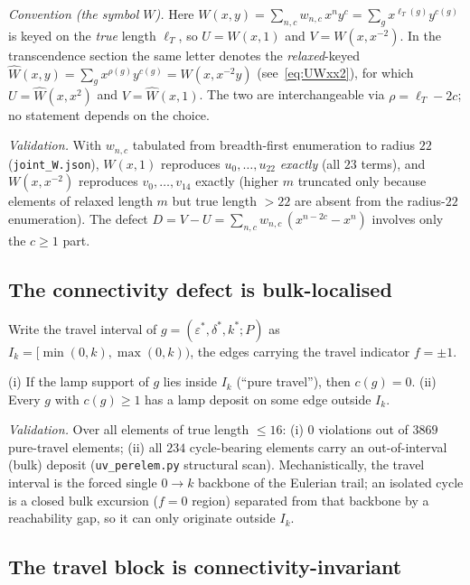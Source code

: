 \noindent\emph{Convention \textup(the symbol $W$\textup).} Here $W(x,y)=\sum_{n,c}w_{n,c}\,x^{n}y^{c}
=\sum_g x^{\ell_T(g)}y^{c(g)}$ is keyed on the \emph{true} length $\ell_T$, so $U=W(x,1)$ and
$V=W(x,x^{-2})$. In the transcendence section the same letter denotes the \emph{relaxed}-keyed
$\widehat W(x,y)=\sum_g x^{\rho(g)}y^{c(g)}=W(x,x^{-2}y)$ \textup(see~\eqref{eq:UWxx2}\textup), for which
$U=\widehat W(x,x^{2})$ and $V=\widehat W(x,1)$. The two are interchangeable via $\rho=\ell_T-2c$; no
statement depends on the choice.

\noindent\emph{Validation.} With $w_{n,c}$ tabulated from breadth-first enumeration
to radius $22$ (\texttt{joint\_W.json}), $W(x,1)$ reproduces $u_0,\dots,u_{22}$
\emph{exactly} (all $23$ terms), and $W(x,x^{-2})$ reproduces $v_0,\dots,v_{14}$
exactly (higher $m$ truncated only because elements of relaxed length $m$ but true
length $>22$ are absent from the radius-$22$ enumeration).  The defect
$D=V-U=\sum_{n,c}w_{n,c}\,(x^{n-2c}-x^n)$ involves only the $c\ge1$ part.

\subsection{The connectivity defect is bulk-localised}

Write the travel interval of $g=(\varepsilon^\ast,\delta^\ast,k^\ast;P)$ as
$I_k=[\min(0,k),\max(0,k))$, the edges carrying the travel indicator $f=\pm1$.

\begin{proposition}\label{prop:local}
\textup{(i)} If the lamp support of $g$ lies inside $I_k$ \textup(``pure travel''\textup),
then $c(g)=0$.  \textup{(ii)} Every $g$ with $c(g)\ge1$ has a lamp deposit on some
edge outside $I_k$.
\end{proposition}

\noindent\emph{Validation.} Over all elements of true length $\le16$: \textup{(i)}
$0$ violations out of $3869$ pure-travel elements; \textup{(ii)} all $234$
cycle-bearing elements carry an out-of-interval (bulk) deposit
(\texttt{uv\_perelem.py} structural scan).  Mechanistically, the travel interval is
the forced single $0\!\to\!k$ backbone of the Eulerian trail; an isolated cycle is a
closed bulk excursion ($f=0$ region) separated from that backbone by a reachability
gap, so it can only originate outside $I_k$.

\subsection{The travel block is connectivity-invariant}


